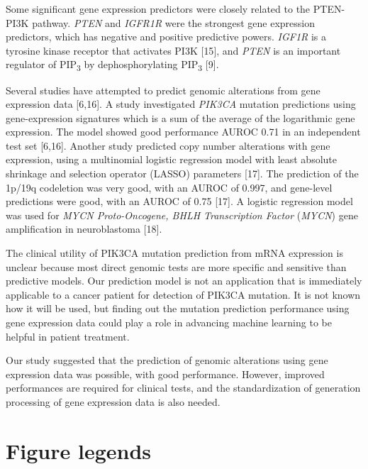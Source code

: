 \documentclass[10pt,letterpaper]{article}
\begin{document}
Some significant gene expression predictors were closely related to the
PTEN-PI3K pathway. \emph{PTEN} and \emph{IGFR1R} were the strongest gene
expression predictors, which has negative and positive predictive
powers. \emph{IGF1R} is a tyrosine kinase receptor that activates PI3K
{[}15{]}, and \emph{PTEN} is an important regulator of
PIP\textsubscript{3} by dephosphorylating PIP\textsubscript{3} {[}9{]}.

Several studies have attempted to predict genomic alterations from gene
expression data {[}6,16{]}. A study investigated \emph{PIK3CA} mutation
predictions using gene-expression signatures which is a sum of the
average of the logarithmic gene expression. The model showed good
performance AUROC 0.71 in an independent test set {[}6,16{]}. Another
study predicted copy number alterations with gene expression, using a
multinomial logistic regression model with least absolute shrinkage and
selection operator (LASSO) parameters {[}17{]}. The prediction of the
1p/19q codeletion was very good, with an AUROC of 0.997, and gene-level
predictions were good, with an AUROC of 0.75 {[}17{]}. A logistic
regression model was used for \emph{MYCN Proto-Oncogene, BHLH
Transcription Factor} (\emph{MYCN}) gene amplification in neuroblastoma
{[}18{]}.

The clinical utility of PIK3CA mutation prediction from mRNA expression
is unclear because most direct genomic tests are more specific and
sensitive than predictive models. Our prediction model is not an
application that is immediately applicable to a cancer patient for
detection of PIK3CA mutation. It is not known how it will be used, but
finding out the mutation prediction performance using gene expression
data could play a role in advancing machine learning to be helpful in
patient treatment.

Our study suggested that the prediction of genomic alterations using
gene expression data was possible, with good performance. However,
improved performances are required for clinical tests, and the
standardization of generation processing of gene expression data is also
needed.

\hypertarget{figure-legends}{%
\section{Figure legends}\label{figure-legends}}
\end{document}
